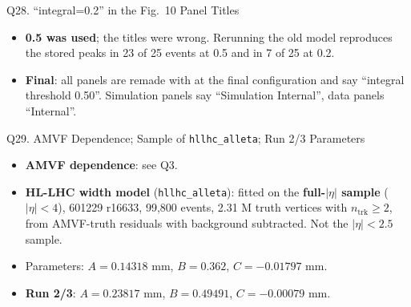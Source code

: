 \begin{frame}{Q28. ``integral=0.2'' in the Fig.~10 Panel Titles}
\small
\begin{itemize}\setlength\itemsep{.45em}
\item \textbf{0.5 was used}; the titles were wrong. Rerunning the old model reproduces the stored peaks in 23 of 25 events at 0.5 and in 7 of 25 at 0.2.
\item \textbf{Final}: all panels are remade with \lpModel{} at the final configuration and say ``integral threshold 0.50''. Simulation panels say ``Simulation Internal'', data panels ``Internal''.
\end{itemize}
\end{frame}

\begin{frame}{Q29. AMVF Dependence; Sample of \texttt{hllhc\_alleta}; Run 2/3 Parameters}
\small
\begin{itemize}\setlength\itemsep{.45em}
\item \textbf{AMVF dependence}: see Q3.
\item \textbf{HL-LHC width model} (\texttt{hllhc\_alleta}): fitted on the \textbf{full-$|\eta|$ sample} ($|\eta|<4$), 601229 r16633, 99,800 events, 2.31 M truth vertices with $n_\mathrm{trk}\ge2$, from AMVF-truth residuals with background subtracted. Not the $|\eta|<2.5$ sample.
\item Parameters: $A=0.14318$ mm, $B=0.362$, $C=-0.01797$ mm.
\item \textbf{Run 2/3}: $A=0.23817$ mm, $B=0.49491$, $C=-0.00079$ mm.
\end{itemize}
\end{frame}
